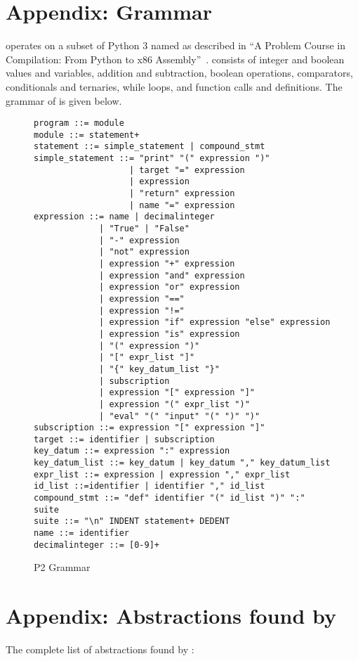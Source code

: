 \FloatBarrier
\section{Appendix: \ptwo{} Grammar} 
\label{sec:grammar}
\toolname operates on a subset of Python 3 named \ptwo{} as described in ``A Problem Course in Compilation: From Python to x86 Assembly''~\cite{pythonbook}. \ptwo{} consists of integer and boolean values and variables, addition and subtraction, boolean operations, comparators, conditionals and ternaries, while loops, and function calls and definitions. The grammar of \ptwo{} is given below.

\begin{figure}
\begin{lstlisting}
program ::= module
module ::= statement+
statement ::= simple_statement | compound_stmt
simple_statement ::= "print" "(" expression ")"
                   | target "=" expression
                   | expression
                   | "return" expression
                   | name "=" expression
expression ::= name | decimalinteger
             | "True" | "False"
             | "-" expression
             | "not" expression
             | expression "+" expression
             | expression "and" expression
             | expression "or" expression
             | expression "=="
             | expression "!="
             | expression "if" expression "else" expression
             | expression "is" expression
             | "(" expression ")"
             | "[" expr_list "]"
             | "{" key_datum_list "}"
             | subscription
             | expression "[" expression "]"
             | expression "(" expr_list ")"
             | "eval" "(" "input" "(" ")" ")"
subscription ::= expression "[" expression "]"
target ::= identifier | subscription
key_datum ::= expression ":" expression
key_datum_list ::= key_datum | key_datum "," key_datum_list
expr_list ::= expression | expression "," expr_list
id_list ::=identifier | identifier "," id_list
compound_stmt ::= "def" identifier "(" id_list ")" ":" suite
suite ::= "\n" INDENT statement+ DEDENT
name ::= identifier
decimalinteger ::= [0-9]+
\end{lstlisting}
\label{fig:grammar}
\caption{P2 Grammar}
\end{figure}

\newpage


\section{Appendix: Abstractions found by \toolname} 
The complete list of abstractions found by \toolname:


